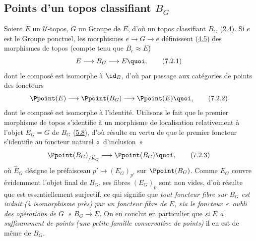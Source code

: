 \documentclass[10pt]{../fichiers-configuration-latex/smfart}
\begin{document}
\subsection{Points d'un topos classifiant
  $B_G$}\pageoriginale

Soient $E$ un $𝒰$-topos, $G$ un Groupe de $E$, d'où un topos
classifiant $B_G$ (\hyperref[IV.subsec2.4]{2.4}). Si $e$ est le Groupe
ponctuel, les morphismes $e\rightarrow G\rightarrow e$ définissent
(\hyperref[IV.subsec4.5]{4.5}) des morphismes de topos (compte tenu que
$B_e\approx E$)
\begin{equation*}
E\longrightarrow B_G \longrightarrow E{\quoi},\tag{7.2.1}
\end{equation*}
dont le composé est isomorphe à $\id_E$, d'où par passage aux
catégories de points des foncteurs
\begin{equation*}
\Ppoint(E)\longrightarrow \Ppoint(B_G)\longrightarrow
\Ppoint(E){\quoi},\tag{7.2.2}
\end{equation*}
dont le composé est isomorphe à l'identité. Utilisons le fait que le
premier morphisme de topos  s'identifie à un morphisme
de localisation relativement à l'objet $E_G=G$ de $B_G$
(\hyperref[IV.subsec5.8]{5.8}), d'où résulte en vertu de  que le
premier foncteur  s'identifie au foncteur naturel « d'inclusion »
\begin{equation*}
\Ppoint(B_G)_{/\widehat{E}_G}\longrightarrow
\Ppoint(B_G){\quoi},\tag{7.2.3}
\end{equation*}
où $\widehat{E}_G$ désigne le préfaisceau $p'\mapsto (E_G)_{p'}$ sur
$\Ppoint(B_G)$. Comme $E_G$ couvre évidemment l'objet final de
$B_G$, ses fibres $(E_G)_p$ sont non vides, d'où résulte que
 est essentiellement surjectif, ce qui signifie que
\emph{tout foncteur fibre sur $B_G$ est induit (à isomorphisme près)
par un foncteur fibre de $E$, via le foncteur « oubli des
opérations de $G$ » $B_G\rightarrow E$.} On en conclut en
particulier que \emph{si $E$ a suffisamment de points (\resp une
petite famille conservative de points)} il en est de même de $B_G$.
\end{document}
